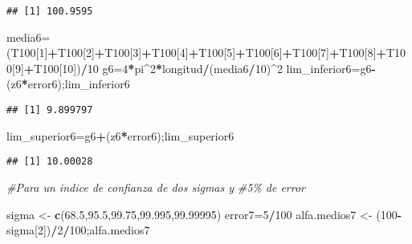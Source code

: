 \documentclass[
]{article}
\newenvironment{Shaded}{\begin{snugshade}}{\end{snugshade}}
\newcommand{\CommentTok}[1]{\textcolor[rgb]{0.56,0.35,0.01}{\textit{#1}}}
\newcommand{\DecValTok}[1]{\textcolor[rgb]{0.00,0.00,0.81}{#1}}
\newcommand{\FloatTok}[1]{\textcolor[rgb]{0.00,0.00,0.81}{#1}}
\newcommand{\FunctionTok}[1]{\textcolor[rgb]{0.13,0.29,0.53}{\textbf{#1}}}
\newcommand{\NormalTok}[1]{#1}
\newcommand{\OtherTok}[1]{\textcolor[rgb]{0.56,0.35,0.01}{#1}}
\newcommand{\SpecialCharTok}[1]{\textcolor[rgb]{0.81,0.36,0.00}{\textbf{#1}}}
\begin{document}
\begin{verbatim}
## [1] 100.9595
\end{verbatim}

\begin{Shaded}
\begin{Highlighting}[]
\NormalTok{media6}\OtherTok{=}\NormalTok{(T100[}\DecValTok{1}\NormalTok{]}\SpecialCharTok{+}\NormalTok{T100[}\DecValTok{2}\NormalTok{]}\SpecialCharTok{+}\NormalTok{T100[}\DecValTok{3}\NormalTok{]}\SpecialCharTok{+}\NormalTok{T100[}\DecValTok{4}\NormalTok{]}\SpecialCharTok{+}\NormalTok{T100[}\DecValTok{5}\NormalTok{]}\SpecialCharTok{+}\NormalTok{T100[}\DecValTok{6}\NormalTok{]}\SpecialCharTok{+}\NormalTok{T100[}\DecValTok{7}\NormalTok{]}\SpecialCharTok{+}\NormalTok{T100[}\DecValTok{8}\NormalTok{]}\SpecialCharTok{+}\NormalTok{T100[}\DecValTok{9}\NormalTok{]}\SpecialCharTok{+}\NormalTok{T100[}\DecValTok{10}\NormalTok{])}\SpecialCharTok{/}\DecValTok{10}
\NormalTok{g6}\OtherTok{=}\DecValTok{4}\SpecialCharTok{*}\NormalTok{pi}\SpecialCharTok{\^{}}\DecValTok{2}\SpecialCharTok{*}\NormalTok{longitud}\SpecialCharTok{/}\NormalTok{(media6}\SpecialCharTok{/}\DecValTok{10}\NormalTok{)}\SpecialCharTok{\^{}}\DecValTok{2}
\NormalTok{lim\_inferior6}\OtherTok{=}\NormalTok{g6}\SpecialCharTok{{-}}\NormalTok{(z6}\SpecialCharTok{*}\NormalTok{error6);lim\_inferior6}
\end{Highlighting}
\end{Shaded}

\begin{verbatim}
## [1] 9.899797
\end{verbatim}

\begin{Shaded}
\begin{Highlighting}[]
\NormalTok{lim\_superior6}\OtherTok{=}\NormalTok{g6}\SpecialCharTok{+}\NormalTok{(z6}\SpecialCharTok{*}\NormalTok{error6);lim\_superior6}
\end{Highlighting}
\end{Shaded}

\begin{verbatim}
## [1] 10.00028
\end{verbatim}

\begin{Shaded}
\begin{Highlighting}[]
\CommentTok{\#Para un indice de confianza de dos sigmas y }
\CommentTok{\#5\% de error}

\NormalTok{sigma }\OtherTok{\textless{}{-}} \FunctionTok{c}\NormalTok{(}\FloatTok{68.5}\NormalTok{,}\FloatTok{95.5}\NormalTok{,}\FloatTok{99.75}\NormalTok{,}\FloatTok{99.995}\NormalTok{,}\FloatTok{99.99995}\NormalTok{)}
\NormalTok{error7}\OtherTok{=}\DecValTok{5}\SpecialCharTok{/}\DecValTok{100}
\NormalTok{alfa.medios7 }\OtherTok{\textless{}{-}}\NormalTok{ (}\DecValTok{100}\SpecialCharTok{{-}}\NormalTok{sigma[}\DecValTok{2}\NormalTok{])}\SpecialCharTok{/}\DecValTok{2}\SpecialCharTok{/}\DecValTok{100}\NormalTok{;alfa.medios7}
\end{Highlighting}
\end{Shaded}
\end{document}
